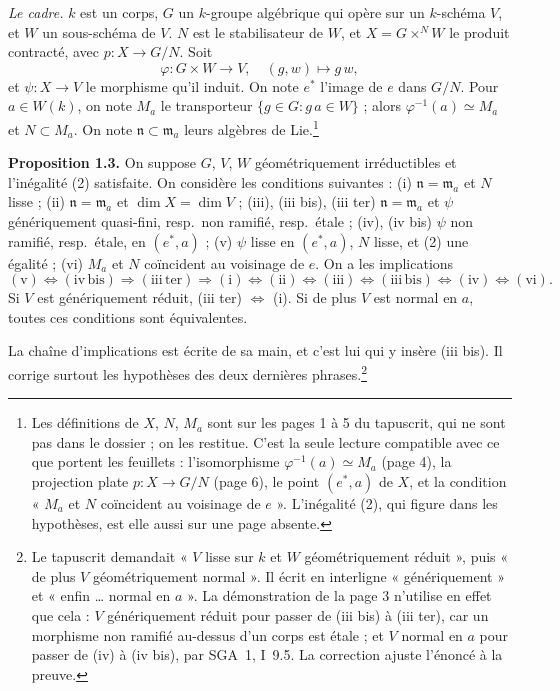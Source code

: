 \documentclass[11pt,a4paper]{article}
\begin{document}
\emph{Le cadre.} $k$ est un corps, $G$ un $k$-groupe algébrique qui opère sur
un $k$-schéma $V$, et $W$ un sous-schéma de $V$. $N$ est le stabilisateur de
$W$, et $X = G \times^{N} W$ le produit contracté, avec
$p : X \to G/N$. Soit
\[
  \varphi : G \times W \to V, \quad (g, w) \mapsto g\,w,
\]
et $\psi : X \to V$ le morphisme qu'il induit. On note $e^{*}$ l'image de $e$
dans $G/N$. Pour $a \in W(k)$, on note $M_{a}$ le transporteur
$\{ g \in G : g\,a \in W \}$ ; alors $\varphi^{-1}(a) \simeq M_{a}$ et
$N \subset M_{a}$. On note $\mathfrak{n} \subset \mathfrak{m}_{a}$ leurs
algèbres de Lie.\footnote{Les définitions de $X$, $N$, $M_{a}$ sont sur les
pages 1 à 5 du tapuscrit, qui ne sont pas dans le dossier ; on les restitue.
C'est la seule lecture compatible avec ce que portent les feuillets :
l'isomorphisme $\varphi^{-1}(a) \simeq M_{a}$ (page 4), la projection plate
$p : X \to G/N$ (page 6), le point $(e^{*}, a)$ de $X$, et la condition
« $M_{a}$ et $N$ coïncident au voisinage de $e$ ». L'inégalité (2), qui
figure dans les hypothèses, est elle aussi sur une page absente.}

\textbf{Proposition 1.3.} On suppose $G$, $V$, $W$ géométriquement
irréductibles et l'inégalité (2) satisfaite. On considère les conditions
suivantes : (i) $\mathfrak{n} = \mathfrak{m}_{a}$ et $N$ lisse ;
(ii) $\mathfrak{n} = \mathfrak{m}_{a}$ et $\dim X = \dim V$ ;
(iii), (iii bis), (iii ter) $\mathfrak{n} = \mathfrak{m}_{a}$ et $\psi$
génériquement quasi-fini, resp.\ non ramifié, resp.\ étale ; (iv), (iv bis)
$\psi$ non ramifié, resp.\ étale, en $(e^{*}, a)$ ; (v) $\psi$ lisse en
$(e^{*}, a)$, $N$ lisse, et (2) une égalité ; (vi) $M_{a}$ et $N$ coïncident
au voisinage de $e$. On a les implications
\[
  \mathrm{(v)} \Leftrightarrow \mathrm{(iv\,bis)} \Rightarrow
  \mathrm{(iii\,ter)} \Rightarrow \mathrm{(i)} \Leftrightarrow
  \mathrm{(ii)} \Leftrightarrow \mathrm{(iii)} \Leftrightarrow
  \mathrm{(iii\,bis)} \Leftrightarrow \mathrm{(iv)} \Leftrightarrow
  \mathrm{(vi)} .
\]
Si $V$ est génériquement réduit, (iii ter) $\Leftrightarrow$ (i). Si de plus
$V$ est normal en $a$, toutes ces conditions sont équivalentes.

La chaîne d'implications est écrite de sa main, et c'est lui qui y insère
(iii bis). Il corrige surtout les hypothèses des deux dernières
phrases.\footnote{Le tapuscrit demandait « $V$ lisse sur $k$ et $W$
géométriquement réduit », puis « de plus $V$ géométriquement normal ». Il
écrit en interligne « génériquement » et « enfin … normal en $a$ ». La
démonstration de la page 3 n'utilise en effet que cela : $V$ génériquement
réduit pour passer de (iii bis) à (iii ter), car un morphisme non ramifié
au-dessus d'un corps est étale ; et $V$ normal en $a$ pour passer de (iv) à
(iv bis), par SGA~1, I~9.5. La correction ajuste l'énoncé à la preuve.}
\end{document}
